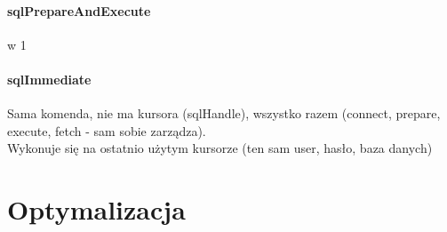 \documentclass[a4paper,twoside]{article}
\begin{document}
  	\subsection*{sqlPrepareAndExecute}  w 1
  	\subsection*{sqlImmediate} \noindent 
  	Sama komenda, nie ma kursora (sqlHandle), wszystko razem (connect, prepare, execute, fetch - sam sobie zarządza).\\ Wykonuje się na ostatnio użytym kursorze (ten sam user, hasło, baza danych)
  	
  	
  	\part*{Optymalizacja}
\end{document}
